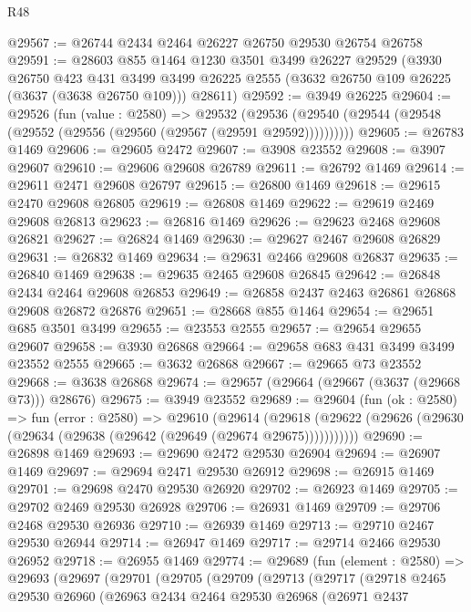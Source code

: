 \begin{lexlean}{R48}
\begin{coremodule}
@29567 := @26744 @2434 @2464 @26227 @26750 @29530 @26754 @26758
@29591 := @28603
    @855
    @1464
    @1230
    @3501
    @3499
    @26227
    @29529
    (@3930
      @26750
      @423
      @431
      @3499
      @3499
      @26225
      @2555
      (@3632 @26750 @109 @26225 (@3637 (@3638 @26750 @109)))
      @28611)
@29592 := @3949 @26225
@29604 := @29526
    (fun (value : @2580) =>
    @29532 (@29536 (@29540 (@29544 (@29548 (@29552 (@29556 (@29560 (@29567 (@29591 @29592))))))))))
@29605 := @26783 @1469
@29606 := @29605 @2472
@29607 := @3908 @23552
@29608 := @3907 @29607
@29610 := @29606 @29608 @26789
@29611 := @26792 @1469
@29614 := @29611 @2471 @29608 @26797
@29615 := @26800 @1469
@29618 := @29615 @2470 @29608 @26805
@29619 := @26808 @1469
@29622 := @29619 @2469 @29608 @26813
@29623 := @26816 @1469
@29626 := @29623 @2468 @29608 @26821
@29627 := @26824 @1469
@29630 := @29627 @2467 @29608 @26829
@29631 := @26832 @1469
@29634 := @29631 @2466 @29608 @26837
@29635 := @26840 @1469
@29638 := @29635 @2465 @29608 @26845
@29642 := @26848 @2434 @2464 @29608 @26853
@29649 := @26858 @2437 @2463 @26861 @26868 @29608 @26872 @26876
@29651 := @28668 @855 @1464
@29654 := @29651 @685 @3501 @3499
@29655 := @23553 @2555
@29657 := @29654 @29655 @29607
@29658 := @3930 @26868
@29664 := @29658 @683 @431 @3499 @3499 @23552 @2555
@29665 := @3632 @26868
@29667 := @29665 @73 @23552
@29668 := @3638 @26868
@29674 := @29657 (@29664 (@29667 (@3637 (@29668 @73))) @28676)
@29675 := @3949 @23552
@29689 := @29604
    (fun (ok : @2580) =>
    fun (error : @2580) =>
    @29610
      (@29614
        (@29618 (@29622 (@29626 (@29630 (@29634 (@29638 (@29642 (@29649 (@29674 @29675)))))))))))
@29690 := @26898 @1469
@29693 := @29690 @2472 @29530 @26904
@29694 := @26907 @1469
@29697 := @29694 @2471 @29530 @26912
@29698 := @26915 @1469
@29701 := @29698 @2470 @29530 @26920
@29702 := @26923 @1469
@29705 := @29702 @2469 @29530 @26928
@29706 := @26931 @1469
@29709 := @29706 @2468 @29530 @26936
@29710 := @26939 @1469
@29713 := @29710 @2467 @29530 @26944
@29714 := @26947 @1469
@29717 := @29714 @2466 @29530 @26952
@29718 := @26955 @1469
@29774 := @29689
    (fun (element : @2580) =>
    @29693
      (@29697
        (@29701
          (@29705
            (@29709
              (@29713
                (@29717
                  (@29718
                    @2465
                    @29530
                    @26960
                    (@26963
                      @2434
                      @2464
                      @29530
                      @26968
                      (@26971
                        @2437

\end{coremodule}
\end{lexlean}
